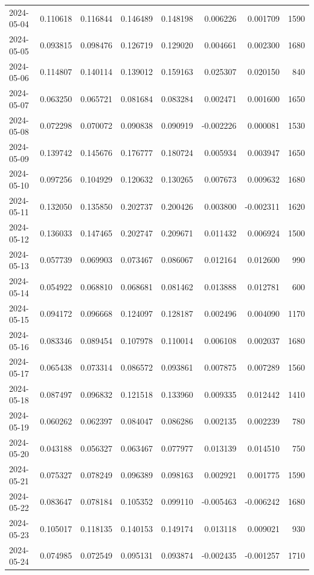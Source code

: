 \begin{tabular}{lrrrrrrr}
2024-05-04 & 0.110618 & 0.116844 & 0.146489 & 0.148198 & 0.006226 & 0.001709 & 1590 \\
2024-05-05 & 0.093815 & 0.098476 & 0.126719 & 0.129020 & 0.004661 & 0.002300 & 1680 \\
2024-05-06 & 0.114807 & 0.140114 & 0.139012 & 0.159163 & 0.025307 & 0.020150 & 840 \\
2024-05-07 & 0.063250 & 0.065721 & 0.081684 & 0.083284 & 0.002471 & 0.001600 & 1650 \\
2024-05-08 & 0.072298 & 0.070072 & 0.090838 & 0.090919 & -0.002226 & 0.000081 & 1530 \\
2024-05-09 & 0.139742 & 0.145676 & 0.176777 & 0.180724 & 0.005934 & 0.003947 & 1650 \\
2024-05-10 & 0.097256 & 0.104929 & 0.120632 & 0.130265 & 0.007673 & 0.009632 & 1680 \\
2024-05-11 & 0.132050 & 0.135850 & 0.202737 & 0.200426 & 0.003800 & -0.002311 & 1620 \\
2024-05-12 & 0.136033 & 0.147465 & 0.202747 & 0.209671 & 0.011432 & 0.006924 & 1500 \\
2024-05-13 & 0.057739 & 0.069903 & 0.073467 & 0.086067 & 0.012164 & 0.012600 & 990 \\
2024-05-14 & 0.054922 & 0.068810 & 0.068681 & 0.081462 & 0.013888 & 0.012781 & 600 \\
2024-05-15 & 0.094172 & 0.096668 & 0.124097 & 0.128187 & 0.002496 & 0.004090 & 1170 \\
2024-05-16 & 0.083346 & 0.089454 & 0.107978 & 0.110014 & 0.006108 & 0.002037 & 1680 \\
2024-05-17 & 0.065438 & 0.073314 & 0.086572 & 0.093861 & 0.007875 & 0.007289 & 1560 \\
2024-05-18 & 0.087497 & 0.096832 & 0.121518 & 0.133960 & 0.009335 & 0.012442 & 1410 \\
2024-05-19 & 0.060262 & 0.062397 & 0.084047 & 0.086286 & 0.002135 & 0.002239 & 780 \\
2024-05-20 & 0.043188 & 0.056327 & 0.063467 & 0.077977 & 0.013139 & 0.014510 & 750 \\
2024-05-21 & 0.075327 & 0.078249 & 0.096389 & 0.098163 & 0.002921 & 0.001775 & 1590 \\
2024-05-22 & 0.083647 & 0.078184 & 0.105352 & 0.099110 & -0.005463 & -0.006242 & 1680 \\
2024-05-23 & 0.105017 & 0.118135 & 0.140153 & 0.149174 & 0.013118 & 0.009021 & 930 \\
2024-05-24 & 0.074985 & 0.072549 & 0.095131 & 0.093874 & -0.002435 & -0.001257 & 1710 \\

\end{tabular}
